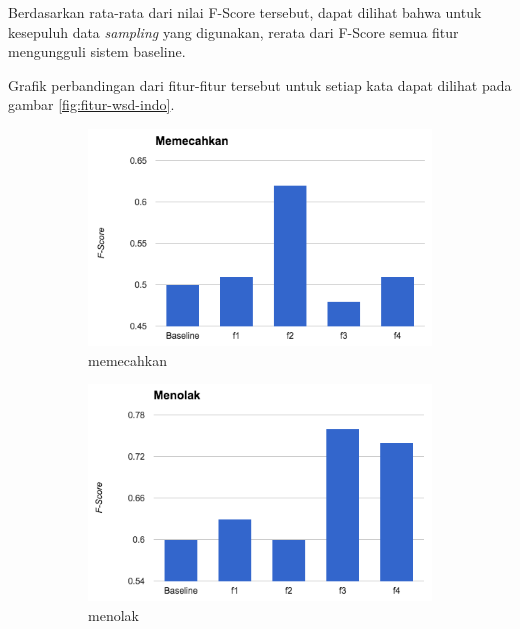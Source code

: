 Berdasarkan rata-rata dari nilai F-Score tersebut, dapat dilihat bahwa untuk kesepuluh data \textit{sampling} yang digunakan, rerata dari F-Score semua fitur mengungguli sistem baseline.

Grafik perbandingan dari fitur-fitur tersebut untuk setiap kata dapat dilihat pada gambar \ref{fig:fitur-wsd-indo}.

\begin{figure}[H]
	\begin{subfigure}{.5\textwidth}
		\centering
		\includegraphics[width=1\linewidth]{adit_pics/memecahkan.png}
		\caption{memecahkan}
	\end{subfigure}%
	\begin{subfigure}{.5\textwidth}
		\centering
		\includegraphics[width=1\linewidth]{adit_pics/menolak.png}
		\caption{menolak}
	\end{subfigure}%
	\\
	\begin{subfigure}{.5\textwidth}

\end{subfigure}
\end{figure}
